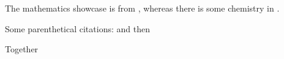 \documentclass{article}
\begin{document}
	The mathematics showcase is from \cite{Graham1995}, whereas there is some chemistry in \cite{Thomas2008}.

	Some parenthetical citations: \citep{Graham1995} and then \citep[p.~56]{Thomas2008}
	
	\citep[See][pp.~45--48]{Graham1995}
	
	Together \citep{Graham1995, Thomas2008}
	
	
	
\end{document}
